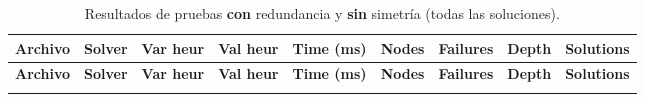 \setlength{\tabcolsep}{4pt}
\begin{longtable}{l l l l r r r r r}
    \caption{Resultados de pruebas \textbf{con} redundancia y \textbf{sin} simetría (todas las soluciones).}\label{tab:pruebas-jobshop_mantenimiento-on-off-all}               \\
    \toprule
    \textbf{Archivo} & \textbf{Solver} & \textbf{Var heur} & \textbf{Val heur} & \textbf{Time (ms)} & \textbf{Nodes} & \textbf{Failures} & \textbf{Depth} & \textbf{Solutions} \\
    \midrule
    \endfirsthead
    \toprule
    \textbf{Archivo} & \textbf{Solver} & \textbf{Var heur} & \textbf{Val heur} & \textbf{Time (ms)} & \textbf{Nodes} & \textbf{Failures} & \textbf{Depth} & \textbf{Solutions} \\
    \midrule
    \endhead
    \bottomrule
    \endlastfoot


\end{longtable}
